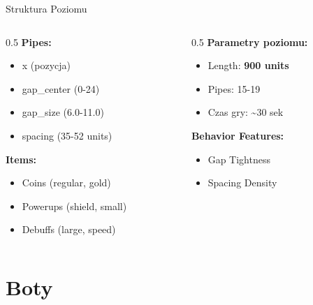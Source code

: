 \documentclass{beamer}
\begin{document}
\begin{frame}{Struktura Poziomu}
\begin{columns}
\begin{column}{0.5\textwidth}
\textbf{Pipes:}
\begin{itemize}
\item x (pozycja)
\item gap\_center (0-24)
\item gap\_size (6.0-11.0)
\item spacing (35-52 units)
\end{itemize}

\textbf{Items:}
\begin{itemize}
\item Coins (regular, gold)
\item Powerups (shield, small)
\item Debuffs (large, speed)
\end{itemize}
\end{column}

\begin{column}{0.5\textwidth}
\textbf{Parametry poziomu:}
\begin{itemize}
\item Length: \textbf{900 units}
\item Pipes: 15-19
\item Czas gry: \textasciitilde30 sek
\end{itemize}

\vspace{0.5cm}
\textbf{Behavior Features:}
\begin{itemize}
\item Gap Tightness
\item Spacing Density
\end{itemize}
\end{column}
\end{columns}
\end{frame}

\section{Boty}
\end{document}
